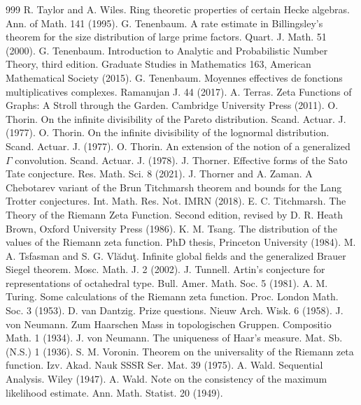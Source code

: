 \begin{thebibliography}{999}
 R. Taylor and A. Wiles. Ring theoretic properties of certain Hecke algebras. Ann. of Math. 141 (1995).
 G. Tenenbaum. A rate estimate in Billingsley's theorem for the size distribution of large prime factors. Quart. J. Math. 51 (2000).
 G. Tenenbaum. Introduction to Analytic and Probabilistic Number Theory, third edition. Graduate Studies in Mathematics 163, American Mathematical Society (2015).
 G. Tenenbaum. Moyennes effectives de fonctions multiplicatives complexes. Ramanujan J. 44 (2017).
 A. Terras. Zeta Functions of Graphs: A Stroll through the Garden. Cambridge University Press (2011).
 O. Thorin. On the infinite divisibility of the Pareto distribution. Scand. Actuar. J. (1977).
 O. Thorin. On the infinite divisibility of the lognormal distribution. Scand. Actuar. J. (1977).
 O. Thorin. An extension of the notion of a generalized $\Gamma$ convolution. Scand. Actuar. J. (1978).
 J. Thorner. Effective forms of the Sato Tate conjecture. Res. Math. Sci. 8 (2021).
 J. Thorner and A. Zaman. A Chebotarev variant of the Brun Titchmarsh theorem and bounds for the Lang Trotter conjectures. Int. Math. Res. Not. IMRN (2018).
 E. C. Titchmarsh. The Theory of the Riemann Zeta Function. Second edition, revised by D. R. Heath Brown, Oxford University Press (1986).
 K. M. Tsang. The distribution of the values of the Riemann zeta function. PhD thesis, Princeton University (1984).
 M. A. Tsfasman and S. G. Vl\u{a}du\c{t}. Infinite global fields and the generalized Brauer Siegel theorem. Mosc. Math. J. 2 (2002).
 J. Tunnell. Artin's conjecture for representations of octahedral type. Bull. Amer. Math. Soc. 5 (1981).
 A. M. Turing. Some calculations of the Riemann zeta function. Proc. London Math. Soc. 3 (1953).
 D. van Dantzig. Prize questions. Nieuw Arch. Wisk. 6 (1958).
 J. von Neumann. Zum Haarschen Mass in topologischen Gruppen. Compositio Math. 1 (1934).
 J. von Neumann. The uniqueness of Haar's measure. Mat. Sb. (N.S.) 1 (1936).
 S. M. Voronin. Theorem on the universality of the Riemann zeta function. Izv. Akad. Nauk SSSR Ser. Mat. 39 (1975).
 A. Wald. Sequential Analysis. Wiley (1947).
 A. Wald. Note on the consistency of the maximum likelihood estimate. Ann. Math. Statist. 20 (1949).

\end{thebibliography}

